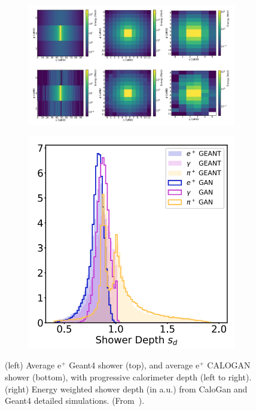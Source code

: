 \begin{figure}[h]
    \centering
    \begin{subfigure}[b]{0.55\textwidth}
    \centering
    \includegraphics[width=1\textwidth]{images/calogan1.png}
    \end{subfigure}
    \hfill
        \begin{subfigure}[b]{0.44\textwidth}
        \includegraphics[width=1\textwidth]{images/calogan2.png}
        \end{subfigure}
\caption{(left) Average e$^+$ Geant4 shower (top), and average e$^+$
CALOGAN shower (bottom), with progressive calorimeter depth
(left to right). (right) Energy weighted shower depth (in a.u.) from CaloGan and Geant4 detailed simulations. (From~\cite{Paganini2018}).}
        \label{fig:calogan}
\end{figure}


